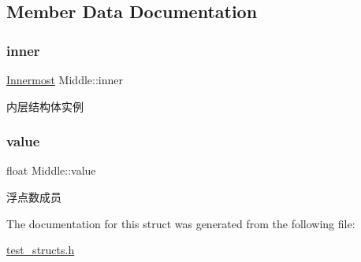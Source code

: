 \subsection{Member Data Documentation}
\mbox{\label{structMiddle_a30f9deb2cdaf831cc66b4a2cae82ac77}} 
\subsubsection{\texorpdfstring{inner}{inner}}
{\footnotesize\ttfamily \hyperlink{structInnermost}{Innermost} Middle\+::inner}



内层结构体实例 

\mbox{\label{structMiddle_a6e2990ab99c9407e3912d19554cd979d}} 
\subsubsection{\texorpdfstring{value}{value}}
{\footnotesize\ttfamily float Middle\+::value}



浮点数成员 



The documentation for this struct was generated from the following file\+:\begin{DoxyCompactItemize}
\item 
\hyperlink{test__structs_8h}{test\+\_\+structs.\+h}\end{DoxyCompactItemize}
